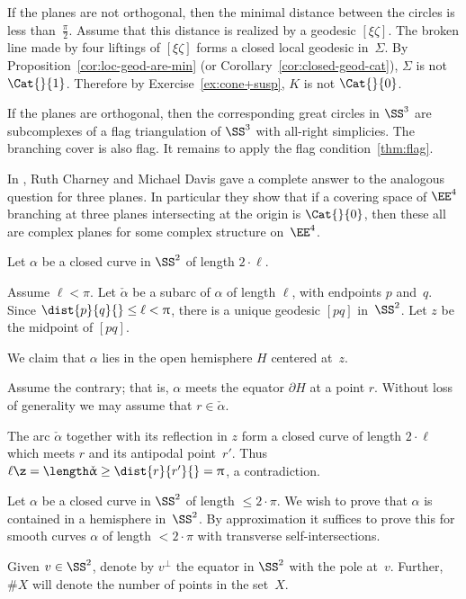 If the planes are not orthogonal, then the minimal distance between the circles is less than~$\tfrac\pi2$.
Assume that this distance is realized by a geodesic $[\xi\zeta]$.
The broken line made by four liftings of $[\xi\zeta]$ forms a closed 
local
geodesic in~$\Sigma$. 
By Proposition~\ref{cor:loc-geod-are-min}
(or Corollary~\ref{cor:closed-geod-cat}),  
$\Sigma$ is not $\Cat{}{1}$.
Therefore by Exercise~\ref{ex:cone+susp}, $K$ is not $\Cat{}{0}$.

If the planes are orthogonal, then the corresponding great circles in $\SS^3$ are subcomplexes of a flag triangulation of $\SS^3$ with all-right simplicies.
The branching cover is also flag.
It remains to apply the flag condition~\ref{thm:flag}.\qeds

In \cite{charney-davis-93}, Ruth Charney and Michael Davis
gave a complete answer to the analogous question for three planes.
In particular they show that if a covering space of $\EE^4$
branching at three planes intersecting at the origin is $\Cat{}{0}$, then these all are complex planes for some complex structure on~$\EE^4$.


Let $\alpha$ be a closed curve in $\SS^2$ of length $2\cdot\ell$.

Assume $\ell<\pi$.
Let $\check\alpha$ be a subarc of $\alpha$ of length $\ell$, with endpoints $p$ and~$q$. 
Since $\dist{p}{q}{}\le\ell<\pi$, there is a unique geodesic $[pq]$ in~$\SS^2$.  
Let $z$ be the midpoint of $[pq]$. 

We claim that $\alpha$ lies in the open hemisphere $H$ centered at~$z$.  

Assume the contrary; that is, $\alpha$ meets the equator $\partial H$ at a point $r$.
Without loss of generality we may assume that $r\in\check\alpha$.

The arc $\check\alpha$ together with its reflection in $z$ form a closed curve of length $2\cdot \ell$ which meets $r$ and its antipodal point~$r'$.
Thus $\ell\z=\length \check\alpha\ge \dist{r}{r'}{}=\pi$, a contradiction.
\qeds

Let $\alpha$ be a closed curve in  $\SS^2$ of length $\le 2\cdot\pi$.  We wish to prove that $\alpha$ is contained in a hemisphere in~$\SS^2$.
By approximation it suffices to prove this for  smooth curves $\alpha$ of length $< 2\cdot\pi$ with transverse self-intersections. 

Given $v\in \SS^2$, denote by $v^\perp$ the equator in $\SS^2$ with the pole at~$v$.
Further, $\# X$ will denote the number of points in the set~$X$.

